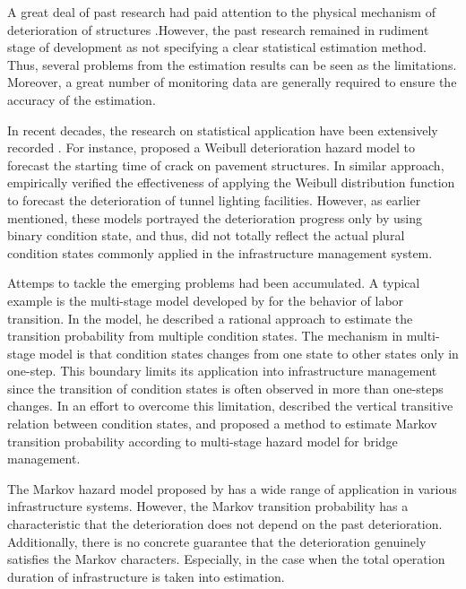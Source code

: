 A great deal of past research had paid attention to the physical mechanism of deterioration of structures \cite{mishalani95,steven}.However, the past research remained in rudiment stage of development as not specifying a clear statistical estimation method. Thus, several problems from the estimation results can be seen as the limitations. Moreover, a great number of monitoring data are generally required to ensure the accuracy of the estimation.

In recent decades, the research on statistical application have been extensively recorded   \cite{lancaster90,gouri}. For instance, \citet{shin} proposed a Weibull deterioration hazard model to forecast the starting time of crack on pavement structures. In similar approach, \citet{aokia} empirically verified the effectiveness of applying the Weibull distribution function to forecast the deterioration of tunnel lighting facilities. However, as earlier mentioned, these models portrayed the deterioration progress only by using binary condition state, and thus, did not totally reflect the actual plural condition states commonly applied in the infrastructure management system.

Attemps to tackle the emerging problems had been accumulated. A typical example is the  multi-stage model developed by \citet{lancaster90} for the behavior of labor transition. In the model, he described a rational approach to estimate the transition probability from multiple condition states. The mechanism in multi-stage model is that condition states  changes from one state to other states only in one-step. This boundary limits its application into infrastructure management since the transition of condition states is often observed in more than one-steps changes. In an effort to overcome this limitation, \citet{kobayashitsuda} described the vertical transitive relation between condition states, and proposed a method to estimate Markov transition probability according to multi-stage hazard model for bridge management.

The Markov hazard model proposed by \citet{kobayashitsuda} has a wide range of application in various infrastructure systems. However, the Markov transition probability has a characteristic that the deterioration does not depend on the past deterioration. Additionally, there is no concrete guarantee that the deterioration genuinely satisfies the Markov characters. Especially, in the case when the total operation duration of infrastructure is taken into estimation. %

